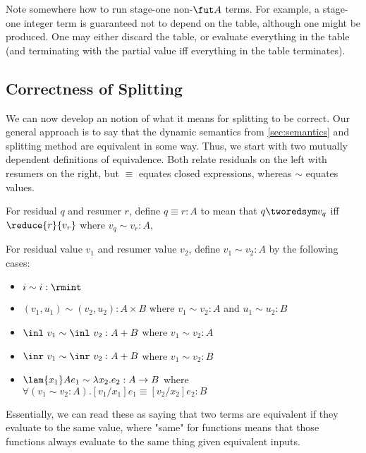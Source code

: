 \TODO
Note somewhere how to run stage-one non-$\fut A$ terms. For example, a stage-one
integer term is guaranteed not to depend on the table, although one might be
produced. One may either discard the table, or evaluate everything in the table
(and terminating with the partial value iff everything in the table terminates).

\subsection{Correctness of Splitting}

We can now develop an notion of what it means for splitting to be correct.  
Our general approach is to say that the dynamic semantics from \ref{sec:semantics} and splitting method are equivalent in some way.  
Thus, we start with two mutually dependent definitions of equivalence.  
Both relate residuals on the left with resumers on the right,
but $\equiv$ equates closed expressions, whereas $\sim$ equates values.

\begin{definition}
For residual $q$ and resumer $r$, define $q \equiv r : A$ to mean that 
$q \tworedsym v_q$ iff $\reduce {r} {v_r}$ where $v_q \sim v_r : A$, 
\end{definition}

\begin{definition}
For residual value $v_1$ and resumer value $v_2$, define $v_1 \sim v_2 : A$ by the following cases:
\begin{itemize}
\item $i \sim i : \rmint$
\item $(v_1,u_1) \sim (v_2,u_2) : A \times B$ where $v_1 \sim v_2 : A$ and $u_1 \sim u_2 : B$
\item $\inl~v_1 \sim \inl~v_2 : A + B$ where $v_1 \sim v_2 : A$
\item $\inr~v_1 \sim \inr~v_2 : A + B$ where $v_1 \sim v_2 : B$
\item $\lam {x_1} A {e_1} \sim \lambda x_2.e_2 : A \to B$ where \\ $\forall (v_1 \sim v_2 : A). [v_1/x_1]e_1 \equiv [v_2/x_2]e_2 : B$
\end{itemize}
\end{definition}

Essentially, we can read these as saying that two terms are equivalent if they evaluate to the same value,
where "same" for functions means that those functions always evaluate to the same thing given equivalent inputs.


